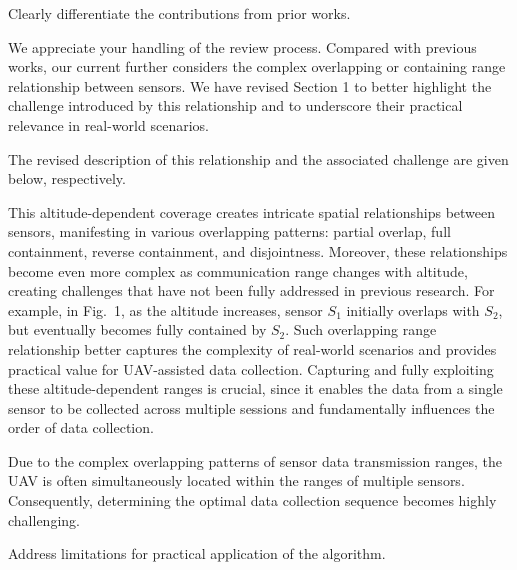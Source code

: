 \editor



\begin{metacomment}
	Clearly differentiate the contributions from prior works.
\end{metacomment}
\begin{metaresponse}
\end{metaresponse}%
	We appreciate your handling of the review process.
	Compared with previous works, our current further considers the complex overlapping or containing range relationship between sensors.
	We have revised Section 1 to better highlight the challenge introduced by this relationship and to underscore their practical relevance in real-world scenarios.
	
	The revised description of this relationship and the associated challenge are given below, respectively.
	\begin{changes}
		This altitude-dependent coverage creates intricate spatial relationships between sensors, manifesting in various overlapping patterns: partial overlap, full containment, reverse containment, and disjointness.
		Moreover, these relationships become even more complex as communication range changes with altitude, creating challenges that have not been fully addressed in previous research.
		For example, in Fig.~1, as the altitude increases, sensor $S_1$ initially overlaps with $S_2$, but eventually becomes fully contained by $S_2$.
		Such overlapping range relationship better captures the complexity of real-world scenarios and provides practical value for UAV-assisted data collection.
		Capturing and fully exploiting these altitude-dependent ranges is crucial, since it enables the data from a single sensor to be collected across multiple sessions and fundamentally influences the order of data collection.
	\end{changes}
	\begin{changes}
		Due to the complex overlapping patterns of sensor data transmission ranges, the UAV is often simultaneously located within the ranges of multiple sensors. Consequently, determining the optimal data collection sequence becomes highly challenging.
	\end{changes}
\begin{metacomment}
	Address limitations for practical application of the algorithm.
\end{metacomment}
\begin{metaresponse}%
	
\end{metaresponse}

